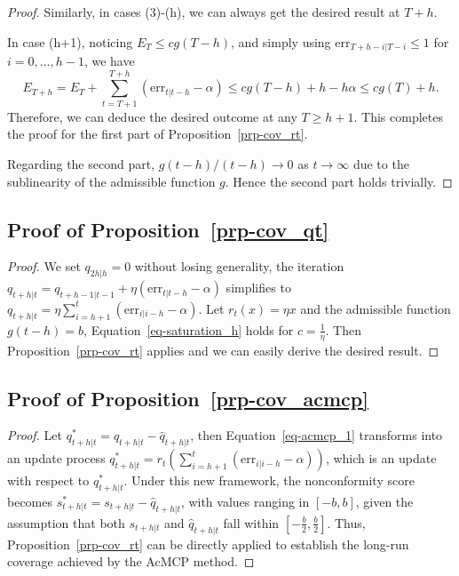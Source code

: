 \documentclass[
  11pt,
  a4paper,
]{article}
\theoremstyle{plain}
\theoremstyle{remark}
\begin{document}
\begin{proof}
Similarly, in cases (3)-(h), we can always get the desired result at
\(T+h\).

In case (h+1), noticing \(E_T \leq cg(T-h)\), and simply using
\(\mathrm{err}_{T+h-i|T-i} \leq 1\) for \(i=0,\ldots,h-1\), we have \[
E_{T+h} = E_T+\sum_{t=T+1}^{T+h}(\mathrm{err}_{t|t-h}-\alpha) \leq cg(T-h)+h-h\alpha \leq cg(T)+h.
\] Therefore, we can deduce the desired outcome at any \(T \geq h+1\).
This completes the proof for the first part of
Proposition~\ref{prp-cov_rt}.

Regarding the second part, \(g(t-h)/(t-h) \rightarrow 0\) as
\(t \rightarrow \infty\) due to the sublinearity of the admissible
function \(g\). Hence the second part holds trivially.
\end{proof}

\subsection{\texorpdfstring{Proof of
Proposition~\ref{prp-cov_qt}}{Proof of Proposition~}}\label{sec-proof_cov_qt}

\begin{proof}
We set \(q_{2h|h}=0\) without losing generality, the iteration
\(q_{t+h|t}=q_{t+h-1|t-1}+\eta (\mathrm{err}_{t|t-h}-\alpha)\)
simplifies to
\(q_{t+h|t}=\eta \sum_{i=h+1}^{t}(\mathrm{err}_{i|i-h}-\alpha)\). Let
\(r_t(x) = \eta x\) and the admissible function \(g(t-h) = b\),
Equation~\ref{eq-saturation_h} holds for \(c=\frac{1}{\eta}\). Then
Proposition~\ref{prp-cov_rt} applies and we can easily derive the
desired result.
\end{proof}

\subsection{\texorpdfstring{Proof of
Proposition~\ref{prp-cov_acmcp}}{Proof of Proposition~}}\label{sec-proof_cov_acmcp}

\begin{proof}
Let \(q_{t+h|t}^{*}=q_{t+h|t}-\hat{q}_{t+h|t}\), then
Equation~\ref{eq-acmcp_1} transforms into an update process
\(q_{t+h|t}^{*}=r_t\left(\sum_{i=h+1}^t (\mathrm{err}_{i|i-h}-\alpha)\right)\),
which is an update with respect to \(q_{t+h|t}^{*}\). Under this new
framework, the nonconformity score becomes
\(s_{t+h|t}^{*}=s_{t+h|t}-\hat{q}_{t+h|t}\), with values ranging in
\([-b,b]\), given the assumption that both \(s_{t+h|t}\) and
\(\hat{q}_{t+h|t}\) fall within \([-\frac{b}{2},\frac{b}{2}]\). Thus,
Proposition~\ref{prp-cov_rt} can be directly applied to establish the
long-run coverage achieved by the AcMCP method.
\end{proof}
\end{document}
